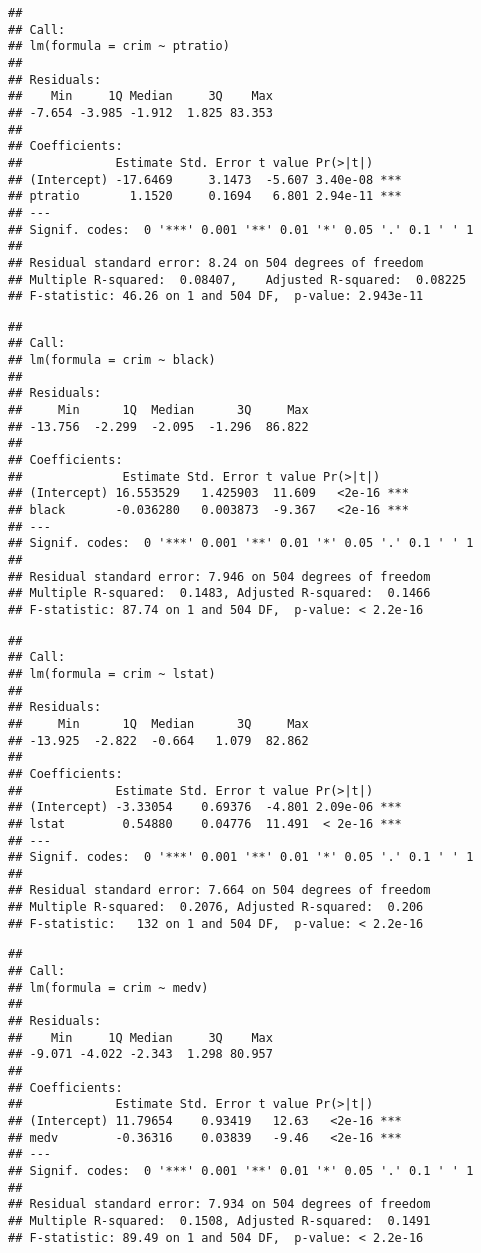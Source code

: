 \documentclass[
]{article}
\begin{document}
\begin{verbatim}
## 
## Call:
## lm(formula = crim ~ ptratio)
## 
## Residuals:
##    Min     1Q Median     3Q    Max 
## -7.654 -3.985 -1.912  1.825 83.353 
## 
## Coefficients:
##             Estimate Std. Error t value Pr(>|t|)    
## (Intercept) -17.6469     3.1473  -5.607 3.40e-08 ***
## ptratio       1.1520     0.1694   6.801 2.94e-11 ***
## ---
## Signif. codes:  0 '***' 0.001 '**' 0.01 '*' 0.05 '.' 0.1 ' ' 1
## 
## Residual standard error: 8.24 on 504 degrees of freedom
## Multiple R-squared:  0.08407,    Adjusted R-squared:  0.08225 
## F-statistic: 46.26 on 1 and 504 DF,  p-value: 2.943e-11
\end{verbatim}

\begin{verbatim}
## 
## Call:
## lm(formula = crim ~ black)
## 
## Residuals:
##     Min      1Q  Median      3Q     Max 
## -13.756  -2.299  -2.095  -1.296  86.822 
## 
## Coefficients:
##              Estimate Std. Error t value Pr(>|t|)    
## (Intercept) 16.553529   1.425903  11.609   <2e-16 ***
## black       -0.036280   0.003873  -9.367   <2e-16 ***
## ---
## Signif. codes:  0 '***' 0.001 '**' 0.01 '*' 0.05 '.' 0.1 ' ' 1
## 
## Residual standard error: 7.946 on 504 degrees of freedom
## Multiple R-squared:  0.1483, Adjusted R-squared:  0.1466 
## F-statistic: 87.74 on 1 and 504 DF,  p-value: < 2.2e-16
\end{verbatim}

\begin{verbatim}
## 
## Call:
## lm(formula = crim ~ lstat)
## 
## Residuals:
##     Min      1Q  Median      3Q     Max 
## -13.925  -2.822  -0.664   1.079  82.862 
## 
## Coefficients:
##             Estimate Std. Error t value Pr(>|t|)    
## (Intercept) -3.33054    0.69376  -4.801 2.09e-06 ***
## lstat        0.54880    0.04776  11.491  < 2e-16 ***
## ---
## Signif. codes:  0 '***' 0.001 '**' 0.01 '*' 0.05 '.' 0.1 ' ' 1
## 
## Residual standard error: 7.664 on 504 degrees of freedom
## Multiple R-squared:  0.2076, Adjusted R-squared:  0.206 
## F-statistic:   132 on 1 and 504 DF,  p-value: < 2.2e-16
\end{verbatim}

\begin{verbatim}
## 
## Call:
## lm(formula = crim ~ medv)
## 
## Residuals:
##    Min     1Q Median     3Q    Max 
## -9.071 -4.022 -2.343  1.298 80.957 
## 
## Coefficients:
##             Estimate Std. Error t value Pr(>|t|)    
## (Intercept) 11.79654    0.93419   12.63   <2e-16 ***
## medv        -0.36316    0.03839   -9.46   <2e-16 ***
## ---
## Signif. codes:  0 '***' 0.001 '**' 0.01 '*' 0.05 '.' 0.1 ' ' 1
## 
## Residual standard error: 7.934 on 504 degrees of freedom
## Multiple R-squared:  0.1508, Adjusted R-squared:  0.1491 
## F-statistic: 89.49 on 1 and 504 DF,  p-value: < 2.2e-16
\end{verbatim}
\end{document}
